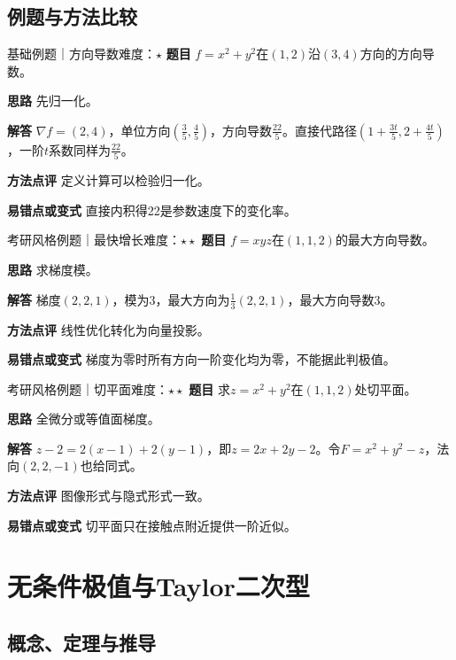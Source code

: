 \subsection{例题与方法比较}
\begin{example}{基础例题｜方向导数}{难度：$\star$}
\label{ex:6:7}\textbf{题目} $f=x^2+y^2$在$(1,2)$沿$(3,4)$方向的方向导数。\par
\textbf{思路} 先归一化。\par
\textbf{解答} $\nabla f=(2,4)$，单位方向$(\frac{3}{5},\frac{4}{5})$，方向导数$\frac{22}{5}$。直接代路径$(1+\frac{3t}{5},2+\frac{4t}{5})$，一阶$t$系数同样为$\frac{22}{5}$。\par
\textbf{方法点评} 定义计算可以检验归一化。\par
\textbf{易错点或变式} 直接内积得22是参数速度下的变化率。
\end{example}
\begin{example}{考研风格例题｜最快增长}{难度：$\star\star$}
\label{ex:6:8}\textbf{题目} $f=xyz$在$(1,1,2)$的最大方向导数。\par
\textbf{思路} 求梯度模。\par
\textbf{解答} 梯度$(2,2,1)$，模为3，最大方向为$\frac{1}{3}(2,2,1)$，最大方向导数3。\par
\textbf{方法点评} 线性优化转化为向量投影。\par
\textbf{易错点或变式} 梯度为零时所有方向一阶变化均为零，不能据此判极值。
\end{example}
\begin{example}{考研风格例题｜切平面}{难度：$\star\star$}
\label{ex:6:9}\textbf{题目} 求$z=x^2+y^2$在$(1,1,2)$处切平面。\par
\textbf{思路} 全微分或等值面梯度。\par
\textbf{解答} $z-2=2(x-1)+2(y-1)$，即$z=2x+2y-2$。令$F=x^2+y^2-z$，法向$(2,2,-1)$也给同式。\par
\textbf{方法点评} 图像形式与隐式形式一致。\par
\textbf{易错点或变式} 切平面只在接触点附近提供一阶近似。
\end{example}
\section{无条件极值与Taylor二次型}\label{sec:6:4}
\subsection{概念、定理与推导}

